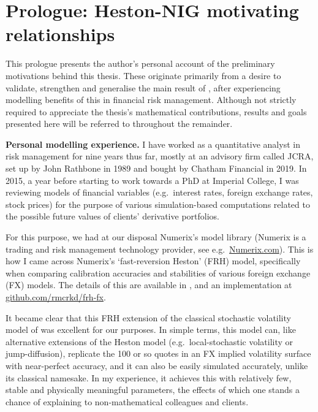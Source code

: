\clearpage

\pagestyle{fancy}
\fancyhf{}
\renewcommand{\headrulewidth}{0pt}
\cfoot{\thepage}

\section*{\hypertarget{prologue}{Prologue: Heston-NIG motivating relationships}}

This prologue presents the author's personal account of the preliminary motivations behind this thesis. These originate primarily from a desire to validate, strengthen and generalise the main result of \cite{mechkov_2015}, after experiencing modelling benefits of this in financial risk management. Although not strictly required to appreciate the thesis's mathematical contributions, results and goals presented here will be referred to throughout the remainder.

\vspace{3mm}\textbf{Personal modelling experience.} I have worked as a quantitative analyst in risk management for nine years thus far, mostly at an advisory firm called JCRA, set up by John Rathbone in 1989 and bought by Chatham Financial in 2019. In 2015, a year before starting to work towards a PhD at Imperial College, I was reviewing models of financial variables (e.g.~interest rates, foreign exchange rates, stock prices) for the purpose of various simulation-based computations related to the possible future values of clients' derivative portfolios.

For this purpose, we had at our disposal Numerix's model library (Numerix is a trading and risk management technology provider, see e.g.~\href{https://www.numerix.com/}{Numerix.com}). This is how I came across Numerix's `fast-reversion Heston' (FRH) model, specifically when comparing calibration accuracies and stabilities of various foreign exchange (FX) models. The details of this are available in \cite{mechkov_2015}, and an implementation at \href{https://github.com/rmcrkd/frh-fx}{github.com/rmcrkd/frh-fx}.

It became clear that this FRH extension of the classical stochastic volatility model of \cite{heston_1993} was excellent for our purposes. In simple terms, this model can, like alternative extensions of the Heston model (e.g.~local-stochastic volatility or jump-diffusion), replicate the 100 or so quotes in an FX implied volatility surface with near-perfect accuracy, and it can also be easily simulated accurately, unlike its classical namesake. In my experience, it achieves this with relatively few, stable and physically meaningful parameters, the effects of which one stands a chance of explaining to non-mathematical colleagues and clients.

